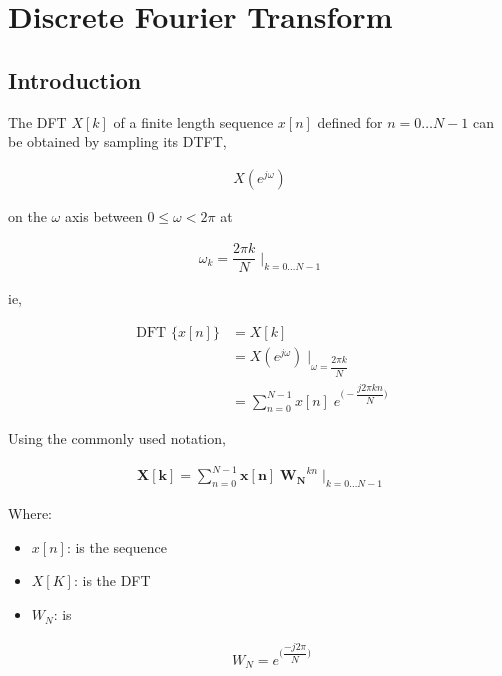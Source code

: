 \documentclass[../course]{subfiles}
\begin{document}
\chapter {Discrete Fourier Transform}



\section {Introduction}


The DFT $X[k]$ of a finite length sequence $x[n]$ defined for
$n = 0 \ldots N-1$ can be obtained by sampling its DTFT,

\begin{align}
    X(e^{j\omega})
\end{align}

on the $\omega$ axis between $0 \leq \omega < 2 \pi$ at

\begin{align}
    \omega_{k} = \dfrac{2 \pi k}{N}
    \; \bigg|_{ k = 0 \ldots N - 1 }
\end{align}

ie,

\begin{align}
    \mbox{ DFT }\{x[n]\} &= X[k] \\
    &= X(e^{ j \omega }) \; \bigg|_{ \omega = \dfrac{ 2 \pi k }{ N }} \\
    &= \sum_{ n = 0 }^{ N - 1 } x[n] \; e^{\bigg( - \dfrac{ j 2 \pi k n }{ N } \bigg)}
\end{align}

Using the commonly used notation,

\begin{align}
    \mathbf{X[k]} =
    \sum_{ n = 0 }^{ N - 1 } \mathbf{x[n]} \; \mathbf{W_{N}}^{kn}
    \; \bigg|_{ k = 0 \ldots N - 1 }
\end{align}

Where:

\begin{itemize} [label=]
    \item $x[n]$: is the sequence
    \item $X[K]$: is the DFT
    \item $W_{N}$: is

        \begin{align}
            W_{N} = e^{\bigg(\dfrac{ - j 2 \pi }{N}\bigg)}
        \end{align}

\end{itemize}
\end{document}
